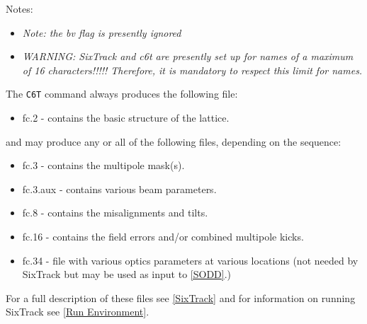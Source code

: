 Notes:
\begin{itemize} 
\item \textit{Note: the bv flag is presently ignored} 
\item \textit{WARNING: SixTrack and c6t are presently set up for
     names of a maximum of 16 characters!!!!! Therefore, it is mandatory
     to respect this limit for \madx names.} 
\end{itemize}

The {\tt C6T} command always produces the following file: 
\begin{itemize}
   \item  fc.2 - contains the basic structure of the lattice. 
\end{itemize} 
and may produce any or all of the following files, depending on  the sequence: 
\begin{itemize}
   \item  fc.3 - contains the multipole mask(s). 
   \item  fc.3.aux - contains various beam parameters. 
   \item  fc.8 - contains the misalignments and tilts. 
   \item  fc.16 - contains the field errors and/or combined multipole kicks. 
   \item  fc.34 - file with various optics parameters at various
     locations (not needed by SixTrack but may be used as input to
     \href{../Introduction/bibliography.html#SODD}{[SODD]}.)  
\end{itemize}  

For a full description of these files see
\href{../Introduction/bibliography.html#SixTrack}{[SixTrack]} and for
information on running SixTrack see
\href{../Introduction/bibliography.html#SixTrack_Run_Environment}{[Run
    Environment]}.  

 
